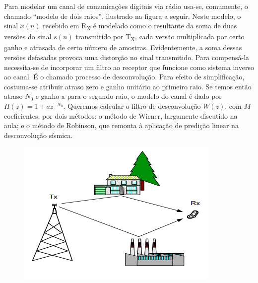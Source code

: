 \noindent
\begin{tcolorbox}[colframe=black,width =7cm,colback=gray!20,arc=0pt]
\end{tcolorbox}

Para modelar um canal de comunicações digitais via rádio usa-se, comumente, o chamado “modelo de dois raios”, ilustrado na figura a seguir.
Neste modelo, o sinal $x(n)$ recebido em R\textsubscript{X} é modelado como o resultante da soma de duas versões do sinal $s(n)$ transmitido por T\textsubscript{X}, cada versão multiplicada por certo ganho e atrasada de certo número de amostras.
Evidentemente, a soma dessas versões defasadas provoca uma distorção no sinal transmitido.
Para compensá-la necessita-se de incorporar um filtro ao receptor que funcione como sistema inverso ao canal.
É o chamado processo de desconvolução.
Para efeito de simplificação, costuma-se atribuir atraso zero e ganho unitário ao primeiro raio.
Se temos então atraso $N_0$ e ganho a para o segundo raio, o modelo do canal é dado por $H(z) = 1 + az^{-N_0}$.
Queremos calcular o filtro de desconvolução $W(z)$, com $M$ coeficientes, por dois métodos:
o método de Wiener, largamente discutido na aula;
e o método de Robinson, que remonta à aplicação de predição linear na desconvolução sísmica.

\begin{figure}[h!]
    \centering
    \includegraphics{../img/03/enunciado}
\end{figure}

